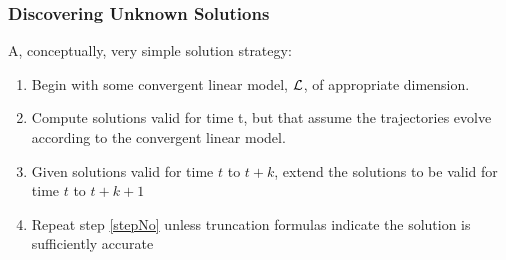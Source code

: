 \documentclass[letter]{beamer}
\begin{document}
\begin{frame}
  \frametitle{Discovering Unknown Solutions}

A, conceptually, very simple solution strategy:  

  \begin{enumerate}
  \item Begin with some convergent linear model, ${\mathcal{L}}$, of appropriate dimension.
  \item Compute solutions valid for time t, 
but that assume the trajectories evolve according to the convergent linear model.
  \item Given solutions valid for time $t$ to $t+k$, extend the solutions to be valid for time $t$ to $t+k+1$ \label{stepNo}
\item Repeat step \ref{stepNo} unless truncation formulas indicate the solution is sufficiently accurate
  \end{enumerate}


\end{frame}
\end{document}
